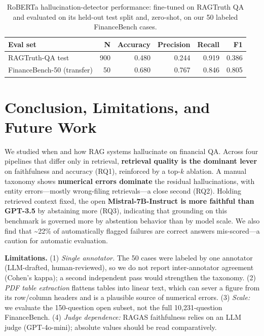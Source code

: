\documentclass[11pt]{article}
\begin{document}
\begin{table}[t]\centering\small
\begin{tabular}{lrrrrr}
\toprule
Eval set & N & Accuracy & Precision & Recall & F1 \\
\midrule
RAGTruth-QA test & 900 & 0.480 & 0.244 & 0.919 & 0.386 \\
FinanceBench-50 (transfer) & 50 & 0.680 & 0.767 & 0.846 & 0.805 \\
\bottomrule
\end{tabular}
\caption{RoBERTa hallucination-detector performance: fine-tuned on RAGTruth QA and evaluated on its held-out test split and, zero-shot, on our 50 labeled FinanceBench cases.}
\label{tab:roberta}
\end{table}

\hypertarget{conclusion-limitations-and-future-work}{%
\section{Conclusion, Limitations, and Future
Work}\label{conclusion-limitations-and-future-work}}

We studied when and how RAG systems hallucinate on financial QA. Across
four pipelines that differ only in retrieval, \textbf{retrieval quality
is the dominant lever} on faithfulness and accuracy (RQ1), reinforced by
a top-\(k\) ablation. A manual taxonomy shows \textbf{numerical errors
dominate} the residual hallucinations, with entity errors---mostly
wrong-filing retrievals---a close second (RQ2). Holding retrieved
context fixed, the open \textbf{Mistral-7B-Instruct is more faithful
than GPT-3.5} by abstaining more (RQ3), indicating that grounding on
this benchmark is governed more by abstention behavior than by model
scale. We also find that \textasciitilde22\% of automatically flagged
failures are correct answers mis-scored---a caution for automatic
evaluation.

\textbf{Limitations.} (1) \emph{Single annotator.} The 50 cases were
labeled by one annotator (LLM-drafted, human-reviewed), so we do not
report inter-annotator agreement (Cohen's kappa); a second independent
pass would strengthen the taxonomy. (2) \emph{PDF table extraction}
flattens tables into linear text, which can sever a figure from its
row/column headers and is a plausible source of numerical errors. (3)
\emph{Scale:} we evaluate the 150-question open subset, not the full
10,231-question FinanceBench. (4) \emph{Judge dependence:} RAGAS
faithfulness relies on an LLM judge (GPT-4o-mini); absolute values
should be read comparatively.
\end{document}
